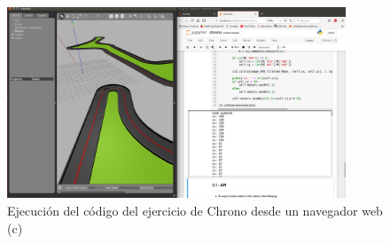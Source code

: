 \begin{figure}[H]
  \begin{center}
    \includegraphics[width=0.9\textwidth]{figures/ejec_3_jup_ch.png}
		\caption{Ejecución del código del ejercicio de Chrono desde un navegador web (c)}
		\label{fig.ecjfr3}
		\end{center}
\end{figure}
